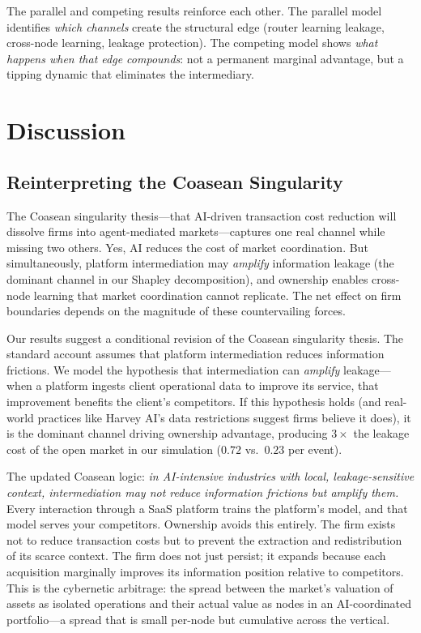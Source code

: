 \documentclass[12pt]{article}
\theoremstyle{definition}
\begin{document}
The parallel and competing results reinforce each other. The parallel model identifies \textit{which channels} create the structural edge (router learning leakage, cross-node learning, leakage protection). The competing model shows \textit{what happens when that edge compounds}: not a permanent marginal advantage, but a tipping dynamic that eliminates the intermediary.

\section{Discussion}

\subsection{Reinterpreting the Coasean Singularity}

The Coasean singularity thesis---that AI-driven transaction cost reduction will dissolve firms into agent-mediated markets---captures one real channel while missing two others. Yes, AI reduces the cost of market coordination. But simultaneously, platform intermediation may \textit{amplify} information leakage (the dominant channel in our Shapley decomposition), and ownership enables cross-node learning that market coordination cannot replicate. The net effect on firm boundaries depends on the magnitude of these countervailing forces.

Our results suggest a conditional revision of the Coasean singularity thesis. The standard account assumes that platform intermediation reduces information frictions. We model the hypothesis that intermediation can \textit{amplify} leakage---when a platform ingests client operational data to improve its service, that improvement benefits the client's competitors. If this hypothesis holds (and real-world practices like Harvey AI's data restrictions suggest firms believe it does), it is the dominant channel driving ownership advantage, producing $3\times$ the leakage cost of the open market in our simulation ($0.72$ vs.\ $0.23$ per event).

The updated Coasean logic: \textit{in AI-intensive industries with local, leakage-sensitive context, intermediation may not reduce information frictions but amplify them.} Every interaction through a SaaS platform trains the platform's model, and that model serves your competitors. Ownership avoids this entirely. The firm exists not to reduce transaction costs but to prevent the extraction and redistribution of its scarce context. The firm does not just persist; it expands because each acquisition marginally improves its information position relative to competitors. This is the cybernetic arbitrage: the spread between the market's valuation of assets as isolated operations and their actual value as nodes in an AI-coordinated portfolio---a spread that is small per-node but cumulative across the vertical.
\end{document}
